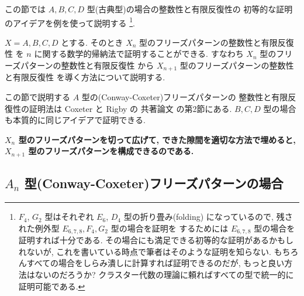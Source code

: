 \documentclass[12pt,twoside,dvipdfm]{jarticle}
\newcommand\red{\color{red}}
\theoremstyle{definition} %
\theoremstyle{definition} %
\theoremstyle{definition} %
\numberwithin{theorem}{section}
\numberwithin{equation}{section}
\numberwithin{figure}{section}
\numberwithin{table}{section}
\begin{document}
この節では $A,B,C,D$ 型(古典型)の場合の整数性と有限反復性の
初等的な証明のアイデアを例を使って説明する%
\footnote{$F_4$, $G_2$ 型はそれぞれ $E_6$, $D_4$ 型の折り畳み(folding)
になっているので, 残された例外型 $E_{6,7,8},F_4,G_2$ 型の場合を証明を
するためには $E_{6,7,8}$ 型の場合を証明すれば十分である.
その場合にも満足できる初等的な証明があるかもしれないが, 
これを書いている時点で筆者はそのような証明を知らない.
もちろんすべての場合をしらみ潰しに計算すれば証明できるのだが,
もっと良い方法はないのだろうか?
クラスター代数の理論に頼ればすべての型で統一的に証明可能である.}.

$X=A,B,C,D$ とする.
そのとき $X_n$ 型のフリーズパターンの整数性と有限反復性
を $n$ に関する数学的帰納法で証明することができる.
すなわち $X_n$ 型のフリーズパターンの整数性と有限反復性
から $X_{n+1}$ 型のフリーズパターンの整数性と有限反復性
を導く方法について説明する.

この節で説明する $A$ 型の(Conway-Coxeter)フリーズパターンの
整数性と有限反復性の証明法は Coxeter と Rigby の
共著論文 \cite{Coxeter-Rigby} の第2節にある. 
$B,C,D$ 型の場合も本質的に同じアイデアで証明できる.

{\bf\red
$X_n$ 型のフリーズパターンを切って広げて, 
できた隙間を適切な方法で埋めると, 
$X_{n+1}$ 型のフリーズパターンを構成できるのである.}


\subsection{$A_n$ 型(Conway-Coxeter)フリーズパターンの場合}
\label{sec:proof-A}
\end{document}
